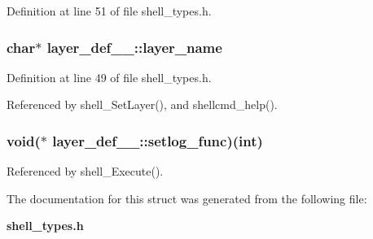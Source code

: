 Definition at line 51 of file shell\_\-types.h.
\subsubsection{\setlength{\rightskip}{0pt plus 5cm}char$\ast$ {\bf layer\_\-def\_\-\_\-::layer\_\-name}}\label{structlayer__def_____o0}




Definition at line 49 of file shell\_\-types.h.

Referenced by shell\_\-Set\-Layer(), and shellcmd\_\-help().
\subsubsection{\setlength{\rightskip}{0pt plus 5cm}void($\ast$ {\bf layer\_\-def\_\-\_\-::setlog\_\-func})(int)}\label{structlayer__def_____o3}




Referenced by shell\_\-Execute().

The documentation for this struct was generated from the following file:\begin{CompactItemize}
\item 
{\bf shell\_\-types.h}\end{CompactItemize}
